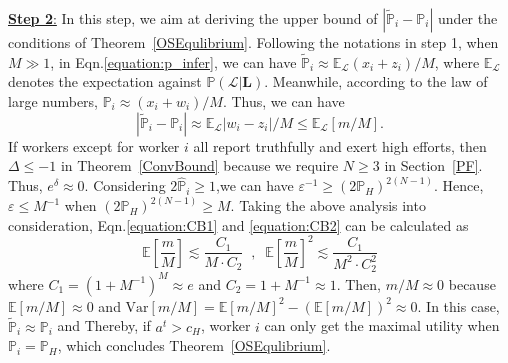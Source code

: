 \underline{\textbf{Step 2}:} In this step, we aim at deriving the upper bound of $|\tilde{\mathbb{P}}_i-\mathbb{P}_i|$ under the conditions of Theorem~\ref{OSEqulibrium}. Following the notations in step 1, when $M\gg 1$, in Eqn.\ref{equation:p_infer}, we can have $\tilde{\mathbb{P}}_i\approx \mathbb{E}_{\mathcal{L}}(x_i+z_i)/M$, where $\mathbb{E}_{\mathcal{L}}$ denotes the expectation against $\mathbb{P}(\mathcal{L}|\bm{L})$. Meanwhile, according to the law of large numbers, $\mathbb{P}_i\approx (x_i+w_i)/M$. Thus, we can have
\begin{equation}
|\tilde{\mathbb{P}}_i-\mathbb{P}_i|\approx \mathbb{E}_{\mathcal{L}}|w_i-z_i|/M\leq \mathbb{E}_{\mathcal{L}}\left[m/M\right].
\end{equation}
If workers except for worker $i$ all report truthfully and exert high efforts, then $\Delta \leq -1$ in Theorem~\ref{ConvBound} because we require $N\geq 3$ in Section~\ref{PF}.
Thus, $e^{\delta}\approx 0$.
Considering $2\hat{\mathbb{P}}_i\geq 1$,we can have $\varepsilon^{-1}\geq (2\mathbb{P}_H)^{2(N-1)}$.
Hence, $\varepsilon\leq M^{-1}$ when $(2\mathbb{P}_H)^{2(N-1)} \geq M$.
Taking the above analysis into consideration, Eqn.\ref{equation:CB1} and \ref{equation:CB2} can be calculated as
\begin{equation}
\mathbb{E}\left[\frac{m}{M}\right]\lesssim \frac{C_{1}}{M\cdot C_2}\;\;, \;\;\mathbb{E}\left[\frac{m}{M}\right]^2\lesssim \frac{C_{1}}{M^2\cdot C_2^2}
\end{equation}
where $C_{1}=(1+M^{-1})^{M}\approx e$ and $C_{2}=1+M^{-1}\approx 1$.
Then, $m/M\approx 0$ because $\mathbb{E}[m/M]\approx 0$ and $\mathrm{Var}[m/M]=\mathbb{E}[m/M]^2-(\mathbb{E}[m/M])^2 \approx 0$.
In this case, $\tilde{\mathbb{P}}_i\approx \mathbb{P}_i$ and 
Thereby, if $a^t>c_H$, worker $i$ can only get the maximal utility when $\mathbb{P}_i=\mathbb{P}_H$, which concludes Theorem~\ref{OSEqulibrium}.

